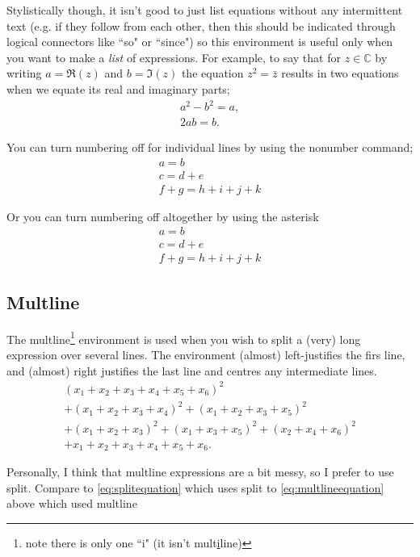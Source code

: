 \documentclass[a4paper,11pt]{article}
\begin{document}
Stylistically though, it isn't good to just list equations without any intermittent text (e.g. if they follow from each other, then this should be indicated through logical connectors like ``so" or ``since") so this environment is useful only when you want to make a \emph{list} of expressions. For example, to say that for $z\in \mathbb{C}$ by writing $a=\Re(z)$ and $b=\Im(z)$ the equation $z^2=\bar{z}$ results in two equations when we equate its real and imaginary parts; 
\begin{gather}
a^2-b^2 = a, \\
2ab=b.
\end{gather}

You can turn numbering off for individual lines by using the nonumber command; 
\begin{gather}
a= b\\
c=d+e \nonumber \\
f+g=h+i+j+k
\end{gather}

Or you can turn numbering off altogether by using the asterisk
\begin{gather*}
a= b\\
c=d+e\\
f+g=h+i+j+k
\end{gather*}

\pagebreak

\subsection{Multline}

The multline\footnote{note there is only one ``i" (it isn't mult\underline{i}line)}  environment is used when you wish to split a (very) long expression over several lines. The environment (almost) left-justifies the firs line, and (almost) right justifies the last line and centres any intermediate lines. 
\begin{multline}\label{eq:multlineequation}
(x_1 + x_2 + x_3 + x_4 + x_5 + x_6)^2 \\ 
+ (x_1 + x_2 + x_3 + x_4)^2 + ( x_1 + x_2 + x_3 + x_5)^2  \\
+ (x_1 + x_2 + x_3)^2 + ( x_1 + x_3 + x_5)^2 + (x_2 + x_4 +  x_6)^2 \\
+  x_1 + x_2 + x_3 + x_4 + x_5 + x_6.
\end{multline}

Personally, I think that multline expressions are a bit messy, so I prefer to use split. Compare  to \eqref{eq:splitequation} which uses split to \eqref{eq:multlineequation} above which used multline
\end{document}
